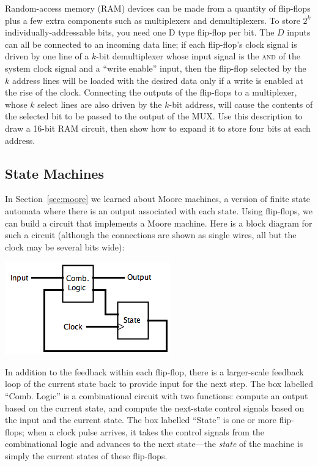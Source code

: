 \begin{exercises}
\problem Random-access memory (RAM) devices can be made from a quantity of flip-flops plus a few extra components such as multiplexers and demultiplexers. To store $2^k$ individually-addressable bits, you need one D type flip-flop per bit. The $D$ inputs can all be connected to an incoming data line; if each flip-flop's clock signal is driven by one line of a $k$-bit demultiplexer whose input signal is the \textsc{and} of the system clock signal and a ``write enable'' input, then the flip-flop selected by the $k$ address lines will be loaded with the desired data only if a write is enabled at the rise of the clock. Connecting the outputs of the flip-flops to a multiplexer, whose $k$ select lines are also driven by the $k$-bit address, will cause the contents of the selected bit to be passed to the output of the MUX. Use this description to draw a 16-bit RAM circuit, then show how to expand it to store four bits at each address.
\end{exercises}

\subsection{State Machines}
In Section~\ref{sec:moore} we learned about Moore machines, a version of finite state automata where there is an output associated with each state. Using flip-flops, we can build a circuit that implements a Moore machine. Here is a block diagram for such a circuit (although the connections are shown as single wires, all but the clock may be several bits wide):
\begin{center}
\includegraphics[width=!,height=!,scale=0.75]{graphics/MooreMachine.png}
\end{center}
In addition to the feedback within each flip-flop, there is a larger-scale feedback loop of the current state back to provide input for the next step. The box labelled ``Comb. Logic'' is a combinational circuit with two functions: compute an output based on the current state, and compute the next-state control signals based on the input and the current state. The box labelled ``State'' is one or more flip-flops; when a clock pulse arrives, it takes the control signals from the combinational logic and advances to the next state---the \emph{state} of the machine is simply the current states of these flip-flops.

